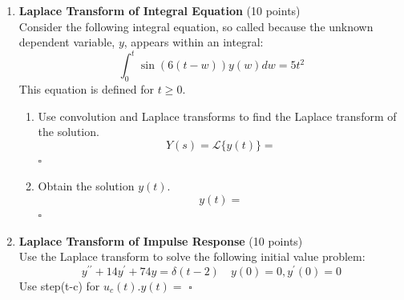 \begin{enumerate}
  Use the form above to write the solution to the differential equation
  $$
  \begin{aligned}
  & \quad y^{\prime \prime}-7 y^{\prime}+10 y=9 t^2 e^{2 t} \quad \text { with } \quad y(0)=-3, \quad y^{\prime}(0)=-9 \\
  & y=\square+(\square * \square)
  \end{aligned}
  $$
  \begin{subanswer}
  \end{subanswer}

  \item \textbf{Laplace Transform of Integral Equation} (10 points)\\
  Consider the following integral equation, so called because the unknown dependent variable, $y$, appears within an integral:
  $$
  \int_0^t \sin (6(t-w)) y(w) d w=5 t^2
  $$
  This equation is defined for $t \geq 0$.
  \begin{enumerate}[label=(\alph*)]
    \item Use convolution and Laplace transforms to find the Laplace transform of the solution.
    $$
    Y(s)=\mathcal{L}\{y(t)\}=
    $$
    $\square$
    \begin{subanswer}
    \end{subanswer}
    \item Obtain the solution $y(t)$.
    $$
    y(t)=
    $$
    $\square$
    \begin{subanswer}
    \end{subanswer}
  \end{enumerate}

  \item \textbf{Laplace Transform of Impulse Response} (10 points)\\
  Use the Laplace transform to solve the following initial value problem:
  $$
  y^{\prime \prime}+14 y^{\prime}+74 y=\delta(t-2) \quad y(0)=0, y^{\prime}(0)=0
  $$
  Use step(t-c) for $u_c(t) . y(t)=$ $\square$
  \begin{subanswer}
  \end{subanswer}


\end{enumerate}
